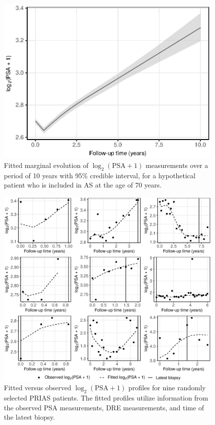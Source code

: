 \begin{figure}[!htb]
\centerline{\includegraphics[width=0.7\columnwidth]{images/marginal_psa.eps}}
\caption{Fitted marginal evolution of $\log_2 (\mbox{PSA} + 1)$ measurements over a period of 10 years with 95\% credible interval, for a hypothetical patient who is included in AS at the age of 70 years.}
\label{fig:fitted_marginal_psa}
\end{figure}

\begin{figure}[!htb]
\centerline{\includegraphics[width=\columnwidth]{images/fitted_9subject_psa.eps}}
\caption{Fitted versus observed ${\log_2 (\mbox{PSA} + 1)}$ profiles for nine randomly selected PRIAS patients. The fitted profiles utilize information from the observed PSA measurements, DRE measurements, and time of the latest biopsy.}
\label{fig:fitted_9subject_psa}
\end{figure}

